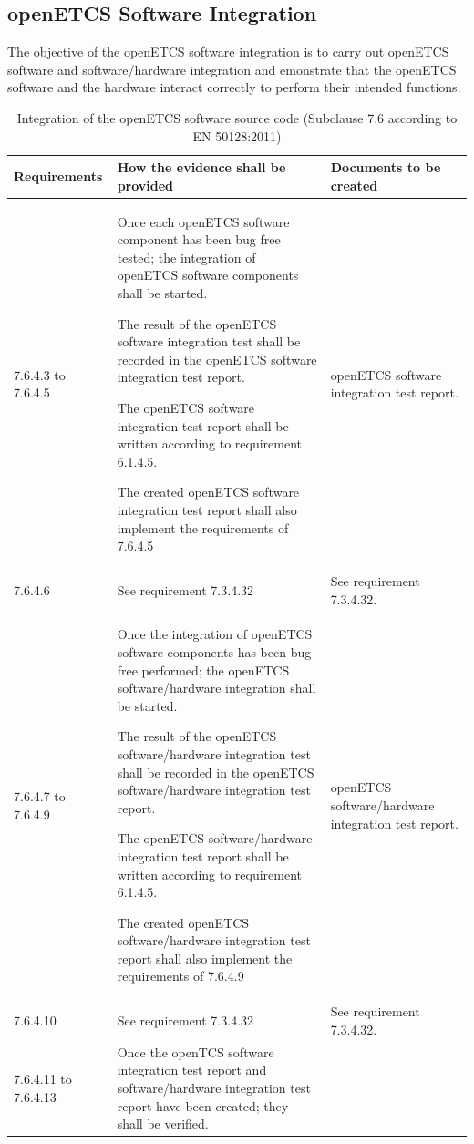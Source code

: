 \documentclass{template/openetcs_report}
\begin{document}
\subsection{openETCS Software Integration}
\begin{flushleft}
The objective of the openETCS software integration is to carry out openETCS software and software/hardware integration and emonstrate that the openETCS software and the hardware interact correctly to perform their intended functions.
\end{flushleft}
{\footnotesize\sffamily\centering
\begin{longtable}{|p{2cm}|p{9cm}|p{3cm}|}
\caption{Integration of the openETCS software source code (Subclause 7.6 according to EN 50128:2011)}\\
\hline
\bfseries Requirements & \bfseries How the evidence shall be provided & \bfseries Documents to be created\\
\hline
\hline
\endhead
\hline
\endfoot

7.6.4.3 to 7.6.4.5 & Once each openETCS software component has been bug free tested; the integration of openETCS software components shall be started.

The result of the openETCS software integration test shall be recorded in the openETCS software integration test report.

The openETCS software integration test report shall be written according to requirement 6.1.4.5.

The created openETCS software integration test report shall also implement the requirements of 7.6.4.5
& openETCS software integration test report.\\ 
\hline
7.6.4.6 & See requirement 7.3.4.32 & See requirement 7.3.4.32.\\ 
\hline
7.6.4.7 to 7.6.4.9 & Once the integration of openETCS software components has been bug free performed; the openETCS software/hardware integration shall be started.

The result of the openETCS software/hardware integration test shall be recorded in the openETCS software/hardware integration test report.

The openETCS software/hardware integration test report shall be written according to requirement 6.1.4.5.

The created openETCS software/hardware integration test report shall also implement the requirements of 7.6.4.9
& openETCS software/hardware integration test report.\\ 
\hline
7.6.4.10 & See requirement 7.3.4.32 & See requirement 7.3.4.32.\\ 
\hline
7.6.4.11 to 7.6.4.13 & Once the openTCS software integration test report and software/hardware integration test report have been created; they shall be verified.


\end{longtable}}
\end{document}
